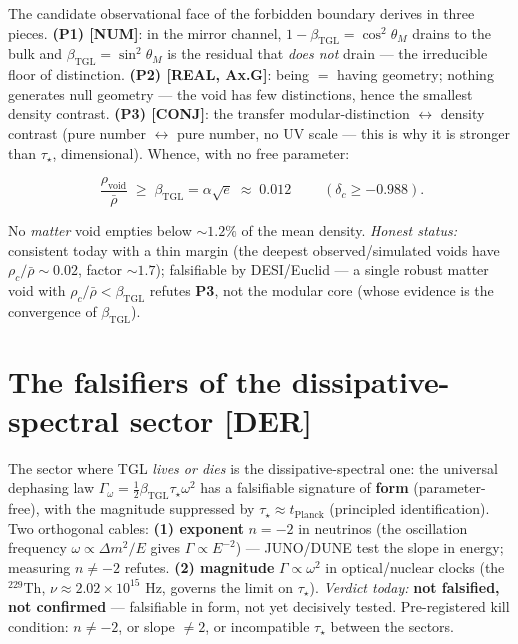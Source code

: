 \documentclass[11pt]{article}
\newcommand{\bTGL}{\beta_{\mathrm{TGL}}}\newcommand{\Msun}{M_{\odot}}\newcommand{\TGL}{\mathrm{TGL}}
\theoremstyle{definition}\newtheorem{deriv}{Derivation}
\begin{document}
The candidate observational face of the forbidden boundary derives in three pieces. \textbf{(P1) \textsf{[NUM]}}: in the mirror channel, $1-\bTGL=\cos^2\theta_M$ drains to the bulk and $\bTGL=\sin^2\theta_M$ is the residual that \emph{does not} drain --- the irreducible floor of distinction. \textbf{(P2) \textsf{[REAL, Ax.G]}}: being $=$ having geometry; nothing generates null geometry --- the void has few distinctions, hence the smallest density contrast. \textbf{(P3) \textsf{[CONJ]}}: the transfer modular-distinction $\leftrightarrow$ density contrast (pure number $\leftrightarrow$ pure number, no UV scale --- this is why it is stronger than $\tau_\star$, dimensional). Whence, with no free parameter:

\begin{equation}\boxed{\;\frac{\rho_{\mathrm{void}}}{\bar\rho}\;\geq\;\bTGL=\alpha\sqrt{e}\;\approx\;0.012\;}\qquad(\delta_c\geq-0.988).\end{equation}

No \emph{matter} void empties below $\sim1.2\%$ of the mean density. \emph{Honest status:} consistent today with a thin margin (the deepest observed/simulated voids have $\rho_c/\bar\rho\sim0.02$, factor $\sim1.7$); falsifiable by DESI/Euclid --- a single robust matter void with $\rho_c/\bar\rho<\bTGL$ refutes \textbf{P3}, not the modular core (whose evidence is the convergence of $\bTGL$).

\section{The falsifiers of the dissipative-spectral sector \textsf{[DER]}}

The sector where TGL \emph{lives or dies} is the dissipative-spectral one: the universal dephasing law $\Gamma_\omega=\tfrac12\bTGL\tau_\star\omega^2$ has a falsifiable signature of \textbf{form} (parameter-free), with the magnitude suppressed by $\tau_\star\approx t_{\mathrm{Planck}}$ (principled identification). Two orthogonal cables: \textbf{(1) exponent} $n=-2$ in neutrinos (the oscillation frequency $\omega\propto\Delta m^2/E$ gives $\Gamma\propto E^{-2}$) --- JUNO/DUNE test the slope in energy; measuring $n\neq-2$ refutes. \textbf{(2) magnitude} $\Gamma\propto\omega^2$ in optical/nuclear clocks (the $^{229}$Th, $\nu\approx2.02\times10^{15}$ Hz, governs the limit on $\tau_\star$). \emph{Verdict today:} \textbf{not falsified, not confirmed} --- falsifiable in form, not yet decisively tested. Pre-registered kill condition: $n\neq-2$, or slope $\neq2$, or incompatible $\tau_\star$ between the sectors.
\end{document}
